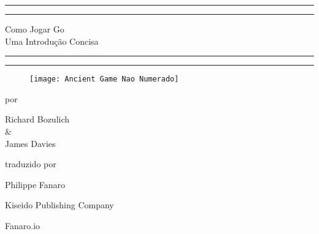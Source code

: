 \begin{titlepage}

    \centering
    
    \scshape %

    \vspace*{-1.5cm}
    
    
    \rule{\textwidth}{1.6pt}\vspace*{-\baselineskip}\vspace*{2pt}
    \rule{\textwidth}{0.4pt}
    
    \vspace{0.7\baselineskip}
    
    \Huge{Como Jogar Go}\\
    \vspace*{10pt}
    \LARGE{Uma Introdução Concisa}
    
    \vspace{0.275\baselineskip}
    
    \rule{\textwidth}{0.4pt}\vspace*{-\baselineskip}\vspace{3.2pt}
    \rule{\textwidth}{1.6pt}

    
    \vspace*{.4cm}

    \begin{figure}[h]
        \centering
        \texttt{[image: Ancient Game Nao Numerado]}
    \end{figure}

    
    \vspace*{0.2cm}

    \large{por}

    \vspace*{0.125cm}

    \Large{Richard Bozulich}\\
    \normalsize{\&}\\
    \Large{James Davies}

    
    \vfill

    \large{traduzido por}

    \vspace*{0.125cm}

    \Large{Philippe Fanaro}
    

    \vfill
    
    \large{Kiseido Publishing Company}

    \vspace*{0.25cm}
    
    \large{Fanaro.io}
\end{titlepage}